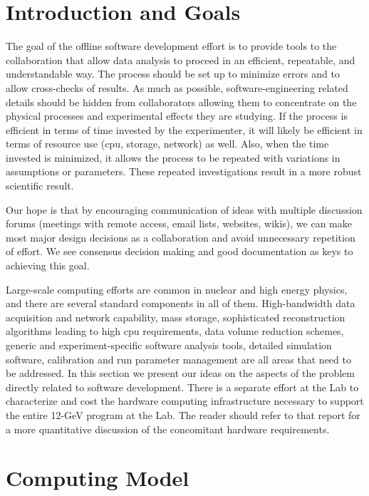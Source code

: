 \section{Introduction and Goals}

The goal of the offline software development effort is to provide tools to 
the collaboration that allow data analysis to proceed in an efficient, 
repeatable, and understandable way. The process should be set up to minimize 
errors and to allow cross-checks of results. As much as possible, 
software-engineering related details should be hidden from collaborators 
allowing them to concentrate on the physical processes and experimental 
effects they are studying. If the process is efficient in terms of time 
invested by the experimenter, it will likely be efficient in terms of resource 
use (cpu, storage, network) as well. Also, when the time invested is minimized,
it allows the process to be repeated with variations in assumptions or 
parameters. These repeated investigations result in a more robust scientific 
result.

Our hope is that by encouraging communication of ideas with multiple 
discussion forums (meetings with remote access, email lists, websites, wikis), 
we can make most major design decisions as a collaboration and avoid 
unnecessary repetition of effort. We see consensus decision making and good 
documentation as keys to achieving this goal.

Large-scale computing efforts are common in nuclear and high energy physics, 
and there are several standard components in all of them. High-bandwidth data 
acquisition and network capability, mass storage, sophisticated reconstruction 
algorithms leading to high cpu requirements, data volume reduction schemes, 
generic and experiment-specific software analysis tools, detailed simulation 
software, calibration and run parameter management are all areas that need to 
be addressed. In this section we present our ideas on the aspects of the 
problem directly related to software development. There is a separate effort 
at the Lab to characterize and cost the hardware computing infrastructure 
necessary to support the entire 12-GeV program at the Lab. The reader 
should refer to that report for a more quantitative discussion of the 
concomitant hardware requirements.

\section{Computing Model}

